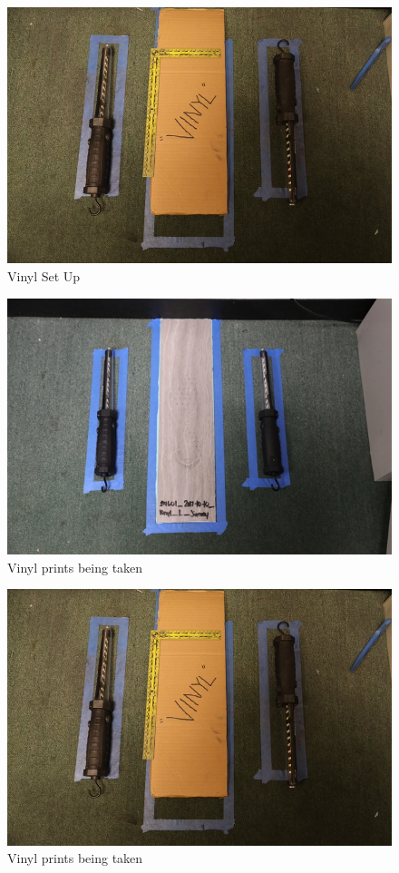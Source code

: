 \begin{figure}[!htp]
\centering
\includegraphics[width=12cm]{Baseline_Vinyl_set}
\caption{Vinyl Set Up}
\label{Image 23}
\end{figure}

\begin{figure}[!htp]
\centering
\includegraphics[width=12cm]{vinyl_set}
\caption{Vinyl prints being taken}
\label{Image 24}
\end{figure}

\begin{figure}[!htp]
\centering
\includegraphics[width=18cm, angle=90]{Baseline_Vinyl_set}
\caption{Vinyl prints being taken}
\label{Image 25}
\end{figure}



